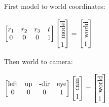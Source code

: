 \begin{definition}
  First model to world coordinates:
  \begin{center}
    \(\begin{bmatrix}
      r_1 & r_2 & r_3 & t \\ 0 & 0 & 0 & 1
    \end{bmatrix} \begin{bmatrix}
      \rotatebox{90}{model } \\ 1
    \end{bmatrix}  = \begin{bmatrix}
      \rotatebox{90}{world } \\ 1
    \end{bmatrix}\)
  \end{center}
  Then world to camera:

  \begin{center}
    \(\begin{bmatrix}
      \text{left} & \text{up} & \text{-dir} & \text{eye} \\ 0 & 0 & 0 & 1
    \end{bmatrix} \begin{bmatrix}
      \rotatebox{90}{cam } \\ 1
    \end{bmatrix} = \begin{bmatrix}
      \rotatebox{90}{world } \\ 1
    \end{bmatrix}\)
  \end{center}
\end{definition}

